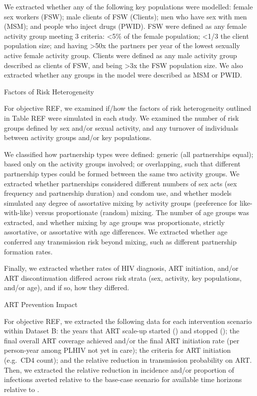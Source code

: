 We extracted whether any of the following key populations were modelled:
female sex workers (FSW);
male clients of FSW (Clients);
men who have sex with men (MSM); and
people who inject drugs (PWID).
FSW were defined as any female activity group meeting 3 criteria:
{<5\%} of the female population;
{<1/3} the client population size; and
having {>50x} the partners per year of
the lowest sexually active female activity group.
Clients were defined as any male activity group
described as clients of FSW, and being {>3x} the FSW population size.
We also extracted whether any groups in the model were described as MSM or PWID.

Factors of Risk Heterogeneity

For objective REF, we examined if/how
the factors of risk heterogeneity outlined in Table REF
were simulated in each study.
We examined the number of risk groups defined by sex and/or sexual activity, and
any turnover of individuals between activity groups and/or key populations.

We classified how partnership types were defined:
generic (all partnerships equal);
based only on the activity groups involved;
or overlapping, such that different partnership types could be formed between the same two activity groups.
We extracted whether partnerships considered different
numbers of sex acts (sex frequency and partnership duration) and condom use,
and whether models simulated any degree of assortative mixing by activity groups
(preference for like-with-like) versus proportionate (random) mixing.
The number of age groups was extracted, and whether mixing by age groups was
proportionate, strictly assortative, or assortative with age differences.
We extracted whether age conferred any transmission risk beyond mixing,
such as different partnership formation rates.

Finally, we extracted whether rates of HIV diagnosis, ART initiation, and/or ART discontinuation
differed across risk strata (sex, activity, key populations, and/or age),
and if so, how they differed.

ART Prevention Impact

For objective REF, we extracted
the following data for each intervention scenario within Dataset B:
the years that ART scale-up started () and stopped ();
the final overall ART coverage achieved and/or
the final ART initiation rate (per person-year among PLHIV not yet in care);
the criteria for ART initiation (e.g.\ CD4 count); and
the relative reduction in transmission probability on ART.
Then, we extracted the
relative reduction in incidence and/or proportion of infections averted
relative to the base-case scenario for available time horizons relative to .

